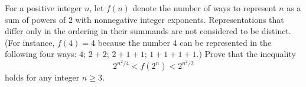 For a positive integer $n$, let $f(n)$ denote the number of ways to represent $n$ as a sum of powers of $2$ with nonnegative integer exponents. Representations that differ only in the ordering in their summands are not considered to be distinct. (For instance, $f(4) = 4$ because the number $4$ can be represented in the following four ways: $4$; $2+2$; $2+1+1$; $1+1+1+1$.) Prove that the inequality
\[ 2^{n^2/4} < f(2^n) < 2^{n^2/2} \]
holds for any integer $n \geq 3$.
